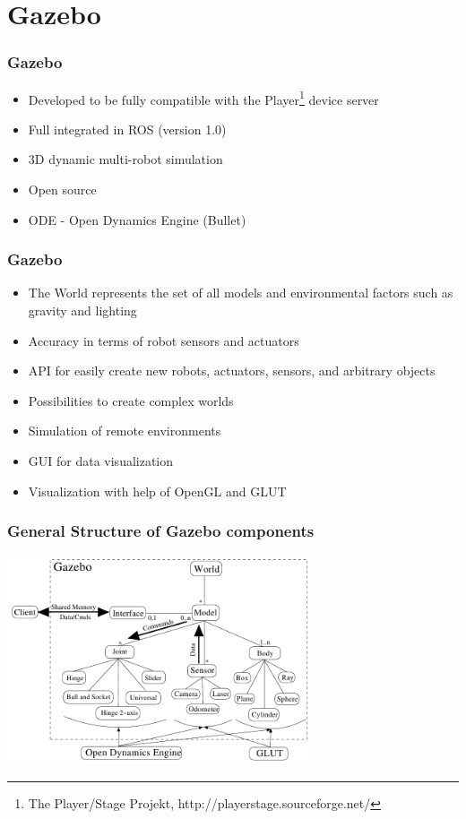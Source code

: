 \section{Gazebo} %
\begin{frame}
  \frametitle{Gazebo}
\begin{itemize}
    \item Developed to be fully compatible with the Player\footnote{The Player/Stage Projekt, http://playerstage.sourceforge.net/} device server
    \item Full integrated in ROS (version 1.0)
    \item 3D dynamic multi-robot simulation
    \item Open source
    \item ODE -  Open Dynamics Engine (Bullet)

   
\end{itemize}
\end{frame}

\begin{frame}
  \frametitle{Gazebo}
\begin{itemize}
    \item The World represents the set of all models and environmental factors such as gravity and lighting
    \item Accuracy in terms of robot sensors and actuators
    \item API for easily create new robots, actuators, sensors, and arbitrary objects
    \item Possibilities to create complex worlds
    \item Simulation of remote environments
    \item GUI for data visualization
    \item Visualization with help of OpenGL and GLUT
    
\end{itemize}
\end{frame}

\begin{frame}
  \frametitle{General Structure of Gazebo components}
\includegraphics[width=9cm]{img/gazebo_struktur.png}
\end{frame}

